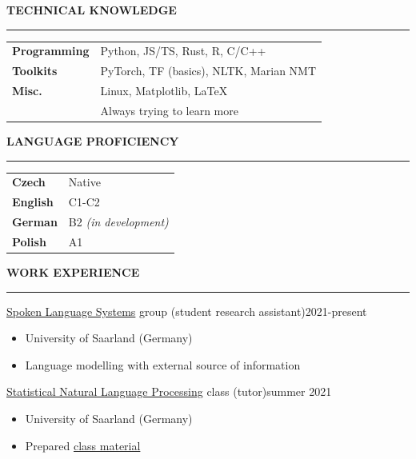 \documentclass[11pt,a4paper]{article} %
\newcommand{\hSection}[1]{
    \medskip
    \MakeUppercase{\bf #1}
    \medskip
    \hrule
}
\newcommand{\hSubsectionItemize}[3]{
    {#1}\hfill {\footnotesize #2}\hspace{-1cm}\\
    \vspace{-0.5cm}
    \begin{itemize} \footnotesize #3 \end{itemize}
    \vspace{0.3\baselineskip}
}
\begin{document}
\vspace{0.1\baselineskip}
\begin{minipage}{.63\textwidth}
    \hSection{Technical Knowledge}
    \hspace{-0.3cm}
    \begin{minipage}{\textwidth}
        \vspace{0.15cm}
        \begin{tabular}{ l l}
        {\bf Programming} & Python, JS/TS, Rust, R, C/C++ \\
        {\bf Toolkits} & PyTorch, TF (basics), NLTK, Marian NMT \\
        {\bf Misc.} & Linux, Matplotlib, LaTeX \\
        & Always trying to learn more
        \end{tabular}
    \end{minipage}
\end{minipage}
\begin{minipage}{.37\textwidth}
    \hSection{Language Proficiency}
    \hspace{-0.3cm}
    \begin{minipage}{\textwidth}
        \vspace{0.15cm}
        \begin{tabular}{ l l}
        {\bf Czech} & Native \\
        {\bf English} & C1-C2\\
        {\bf German} & B2 \textit{(in development)} \\
        {\bf Polish} & A1
        \end{tabular}
    \end{minipage}
\end{minipage}

\vspace{-0.1cm}
\hSection{Work Experience}
\hSubsectionItemize
{\href{https://www.lsv.uni-saarland.de/}{Spoken Language Systems} group (student research assistant)}
{2021-present}
{
    \item University of Saarland (Germany)
    \item Language modelling with external source of information
}

\hSubsectionItemize
{\href{https://teaching.lsv.uni-saarland.de/snlp/}{Statistical Natural Language Processing} class (tutor)}
{summer 2021}
{
    \item University of Saarland (Germany)
    \item Prepared \href{https://github.com/zouharvi/uds-snlp-tutorial}{class material}
}
\end{document}
